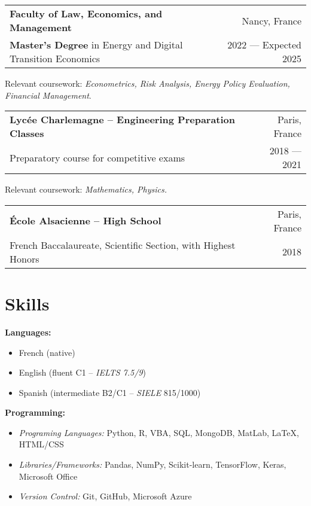 \documentclass[a4paper,9pt]{extarticle}
\begin{document}
\vspace{7pt} %
\noindent
\begin{tabularx}{\textwidth}{@{}Xr@{}}
\textbf{Faculty of Law, Economics, and Management} & Nancy, France\\
\textbf{Master’s Degree} in Energy and Digital Transition Economics & 2022 — Expected 2025\\
\end{tabularx}
\vspace{-5pt}
Relevant coursework: \textit{Econometrics, Risk Analysis, Energy Policy Evaluation, Financial Management}.

\vspace{7pt} %
\noindent
\begin{tabularx}{\textwidth}{@{}Xr@{}}
\textbf{Lycée Charlemagne -- Engineering Preparation Classes} & Paris, France\\
Preparatory course for competitive exams & 2018 — 2021\\
\end{tabularx}
\vspace{-5pt}
Relevant coursework: \textit{Mathematics, Physics.}

\vspace{7pt} %
\noindent
\begin{tabularx}{\textwidth}{@{}Xr@{}}
\textbf{École Alsacienne -- High School} & Paris, France\\
French Baccalaureate, Scientific Section, with Highest Honors & 2018\\
\end{tabularx}

\section*{\faCogs \hspace{0.1em} Skills}
\noindent
\begin{minipage}[t]{0.45\textwidth} %
    \textbf{Languages:}
    \begin{itemize}
        \item French (native)
        \item English (fluent C1 -- \textit{IELTS 7.5/9})
        \item Spanish (intermediate B2/C1 -- \textit{SIELE} 815/1000)
    \end{itemize}
\end{minipage}%
\hfill %
\begin{minipage}[t]{0.45\textwidth} %
    \textbf{Programming:}
    \begin{itemize}
        \item \textit{Programing Languages:} Python, R, VBA, SQL, MongoDB, MatLab, LaTeX, HTML/CSS
        \item \textit{Libraries/Frameworks:} Pandas, NumPy, Scikit-learn, TensorFlow, Keras, Microsoft Office
        \item \textit{Version Control:} Git, GitHub, Microsoft Azure
    \end{itemize}
\end{minipage}
\end{document}
